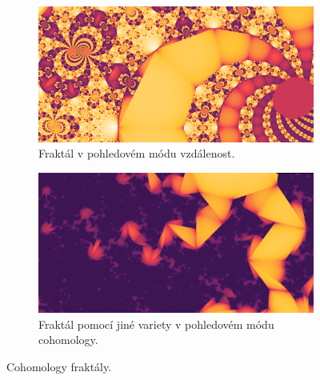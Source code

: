 \documentclass[thesis=B, czech]{FITthesis}[2019/03/06]
\begin{document}
\begin{figure}[h]
\centering
  \begin{subfigure}[b]{0.45\textwidth}
    \includegraphics[width=\textwidth]{images/cohhom1.png}
    \caption[]{\label{fig:coho1}Fraktál v pohledovém módu vzdálenost.}
  \end{subfigure}
  \begin{subfigure}[b]{0.45\textwidth}
    \includegraphics[width=\textwidth]{images/cohhom2.png}
    \caption[]{\label{fig:coho2}Fraktál pomocí jiné variety v pohledovém módu cohomology.}
  \end{subfigure}
   
    \caption{ \label{fig:coho}Cohomology fraktály.}
\end{figure}

\end{document}
